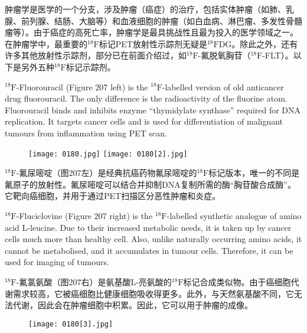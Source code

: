 \documentclass[dvipsnames, svgnames,a4paper,11pt]{article}
\begin{document}
肿瘤学是医学的一个分支，涉及肿瘤（癌症）的治疗，包括实体肿瘤（如肺、乳腺、前列腺、结肠、大脑等）和血液细胞的肿瘤（如白血病、淋巴瘤、多发性骨髓瘤等）。由于癌症的高死亡率，肿瘤学是最具挑战性且最为投入的医学领域之一。在肿瘤学中，最重要的${}^\mathrm{18}\mathrm{F}$标记PET放射性示踪剂无疑是${}^\mathrm{18}\mathrm{F}$DG。除此之外，还有许多其他放射性示踪剂，部分已在前面介绍过，如${}^\mathrm{18}\mathrm{F}$-氟脱氧胸苷（${}^\mathrm{18}\mathrm{F}$-FLT）。以下是另外五种${}^\mathrm{18}\mathrm{F}$标记示踪剂。

${}^\mathrm{18}\mathrm{F}$-Fluorouracil (Figure 207 left) is the ${}^\mathrm{18}\mathrm{F}$-labelled version of old anticancer drug
fluorouracil. The only difference is the radioactivity of the fluorine atom. Fluorouracil
binds and inhibits enzyme “thymidylate synthase” required for DNA replication. It
targets cancer cells and is used for differentiation of malignant tumours from
inflammation using PET scan.

\begin{figure}[h]
	\centering
    \texttt{[image: 0180.jpg]}  
    \texttt{[image: 0180[2].jpg]}    
     \label{fig207}
\end{figure}

${}^\mathrm{18}\mathrm{F}$-氟尿嘧啶（图207左）是经典抗癌药物氟尿嘧啶的${}^\mathrm{18}\mathrm{F}$标记版本，唯一的不同是氟原子的放射性。氟尿嘧啶可以结合并抑制DNA复制所需的酶“胸苷酸合成酶”。它靶向癌细胞，并用于通过PET扫描区分恶性肿瘤和炎症。

${}^\mathrm{18}\mathrm{F}$-Fluciclovine (Figure 207 right) is the ${}^\mathrm{18}\mathrm{F}$-labelled synthetic analogue of amino
acid L-leucine. Due to their increased metabolic needs, it is taken up by cancer cells
much more than healthy cell. Also, unlike naturally occurring amino acids, it cannot
be metabolised, and it accumulates in tumour cells. Therefore, it can be used for
imaging of tumours.

${}^\mathrm{18}\mathrm{F}$-氟氯氨酸（图207右）是氨基酸L-亮氨酸的${}^\mathrm{18}\mathrm{F}$标记合成类似物。由于癌细胞代谢需求较高，它被癌细胞比健康细胞吸收得更多。此外，与天然氨基酸不同，它无法代谢，因此会在肿瘤细胞中积累。因此，它可以用于肿瘤的成像。

\begin{figure}[h]
	\centering
    \texttt{[image: 0180[3].jpg]}  
     \label{fig208}
\end{figure}
\end{document}
